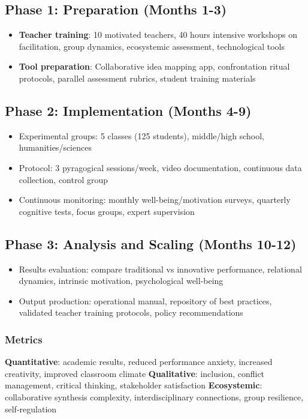 \subsection{Phase 1: Preparation (Months 1-3)}
\begin{itemize}
	\item \textbf{Teacher training}: 10 motivated teachers, 40 hours intensive workshops on facilitation, group dynamics, ecosystemic assessment, technological tools
	\item \textbf{Tool preparation}: Collaborative idea mapping app, confrontation ritual protocols, parallel assessment rubrics, student training materials
\end{itemize}

\subsection{Phase 2: Implementation (Months 4-9)}
\begin{itemize}
	\item Experimental groups: 5 classes (125 students), middle/high school, humanities/sciences
	\item Protocol: 3 pyragogical sessions/week, video documentation, continuous data collection, control group
	\item Continuous monitoring: monthly well-being/motivation surveys, quarterly cognitive tests, focus groups, expert supervision
\end{itemize}

\subsection{Phase 3: Analysis and Scaling (Months 10-12)}
\begin{itemize}
	\item Results evaluation: compare traditional vs innovative performance, relational dynamics, intrinsic motivation, psychological well-being
	\item Output production: operational manual, repository of best practices, validated teacher training protocols, policy recommendations
\end{itemize}

\subsubsection*{Metrics}
\textbf{Quantitative}: academic results, reduced performance anxiety, increased creativity, improved classroom climate  
\textbf{Qualitative}: inclusion, conflict management, critical thinking, stakeholder satisfaction  
\textbf{Ecosystemic}: collaborative synthesis complexity, interdisciplinary connections, group resilience, self-regulation

